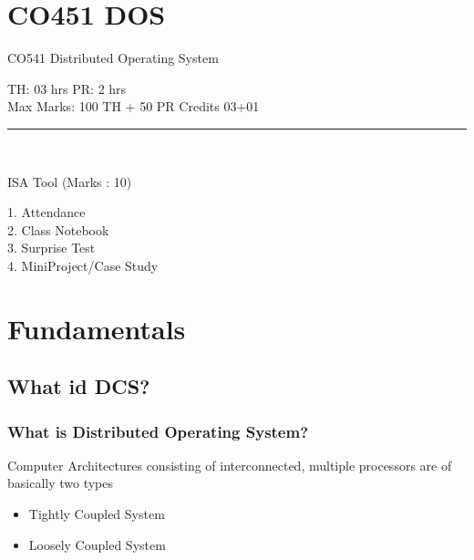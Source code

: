 \documentclass{beamer}
\begin{document}
   


\section{CO451 DOS}
\begin{frame}
\begin{center}
\huge CO541 Distributed Operating System\\
\end{center}
TH: 03 hrs
\hspace{5cm}
PR: 2 hrs\\
Max Marks: 100 TH + 50 PR
\hspace{2cm}
Credits 03+01\\
\noindent\rule{10cm}{0.4pt}\\
\begin{center}
ISA Tool (Marks : 10)\\
\end{center}
\hspace{2cm}1. Attendance\\
\hspace{2cm}2. Class Notebook\\
\hspace{2cm}3. Surprise Test\\
\hspace{2cm}4. MiniProject/Case Study\\
\end{frame} 



\section{Fundamentals}
\subsection{What id DCS?}
    \begin{frame}
        \frametitle{What is Distributed Operating System?}
            Computer Architectures consisting of interconnected, multiple processors are of basically two types
        \vspace{0.02cm}
        \begin{itemize}
            \item Tightly Coupled System
            \item Loosely Coupled System
        \end{itemize}
        \vspace{5cm}
    \end{frame}
\end{document}

